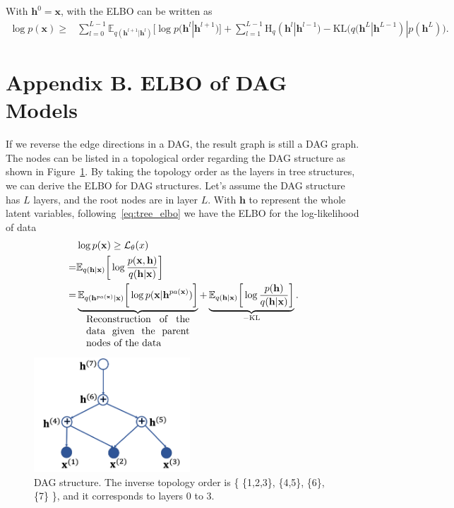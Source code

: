 \documentclass{article} %
\begin{document}
With $\mathbf{h}^0 = \mathbf{x}$,  with the ELBO can be written as 
\begin{align*}
\log p(\mathbf{x}) \geq &   \sum_{l=0}^{L-1}  \mathbb{E}_{q(\mathbf{h}^{l+1}|\mathbf{h}^l)} \bigg[ \log p( \mathbf{h}^{l}|  \mathbf{h}^{l+1})   \bigg] +  \sum_{l=1}^{L-1}   \text{H}_q(\mathbf{h}^l | \mathbf{h}^{l-1} ) -   \text{KL}\big(q(\mathbf{h}^L | \mathbf{h}^{L-1} )   | p(\mathbf{h}^L)  \big) . 
 \end{align*}

\section*{Appendix B.  ELBO of DAG Models}\label{appd:dag_elbo}

If we reverse the edge directions in a DAG, the  result graph is still a DAG graph.  The nodes can be listed in a topological order regarding the DAG structure as shown in Figure~\ref{fig:dag}. By taking the topology order as the layers in tree structures, we can derive the ELBO for DAG structures.  Let's assume the DAG structure has $L$ layers, and the root nodes are in layer $L$. With $\mathbf{h}$ to represent the whole latent variables, following~\eqref{eq:tree_elbo} we have the ELBO for the log-likelihood of  data 
\begin{align}  \label{eq:dag_elbo}
&\log p(\mathbf{x})  \geq  \mathcal{L}_{\theta}(x)  \\ \notag
 =&  \mathbb{E}_{q(\mathbf{h} | \mathbf{x})} \bigg[ \log  \frac{p(\mathbf{x}, \mathbf{h})}{q(\mathbf{h}|\mathbf{x})}  \bigg]  \\ \notag
=&  \underbrace{ \mathbb{E}_{q(\mathbf{h}^{pa(\mathbf{x})} | \mathbf{x})} \bigg[ \log  p(\mathbf{x} | \mathbf{h}^{pa(\mathbf{x})})  \bigg] }_{  \parbox{10.5em}{Reconstruction of the data given the parent nodes of the data}}  +  \underbrace{  \mathbb{E}_{q(\mathbf{h}| \mathbf{x})} \bigg[ \log  \frac{p( \mathbf{h})}{q(\mathbf{h}|\mathbf{x})}  \bigg] }_{-\text{KL}}.   \notag
\end{align}

\begin{figure}[!htbp]
    \centering
    \includegraphics[width=2.3in]{fig/dag.png}
    \caption{DAG structure. The inverse topology order is \big\{ \{1,2,3\}, \{4,5\}, \{6\},  \{7\} \big\}, and it corresponds to layers 0 to 3.  }
    \label{fig:dag}
\end{figure}
\end{document}
